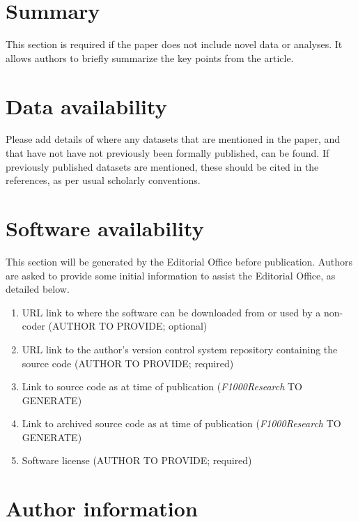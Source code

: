 \documentclass[9pt,a4paper,]{extarticle}
\begin{document}
\section{Summary }\label{summary}

This section is required if the paper does not include novel data or analyses. It allows authors to briefly summarize the key points from the article.

\section{Data availability }\label{data-availability}

Please add details of where any datasets that are mentioned in the paper, and that have not have not previously been formally published, can be found. If previously published datasets are mentioned, these should be cited in the references, as per usual scholarly conventions.

\section{Software availability}\label{software-availability}

This section will be generated by the Editorial Office before publication. Authors are asked to provide some initial information to assist the Editorial Office, as detailed below.

\begin{enumerate}
\def\labelenumi{\arabic{enumi}.}
\item
  URL link to where the software can be downloaded from or used by a non-coder (AUTHOR TO PROVIDE; optional)
\item
  URL link to the author's version control system repository containing the source code (AUTHOR TO PROVIDE; required)
\item
  Link to source code as at time of publication (\emph{F1000Research} TO GENERATE)
\item
  Link to archived source code as at time of publication (\emph{F1000Research} TO GENERATE)
\item
  Software license (AUTHOR TO PROVIDE; required)
\end{enumerate}

\section{Author information}\label{author-information}
\end{document}
